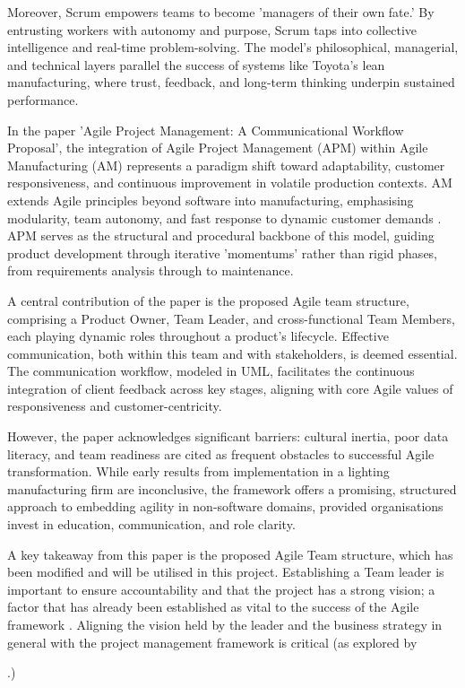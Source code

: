 \documentclass{report}
\begin{document}
Moreover, Scrum empowers teams to become 'managers of their own fate.' By entrusting workers with autonomy and purpose, Scrum taps into collective intelligence and real-time problem-solving. The model's philosophical, managerial, and technical layers parallel the success of systems like Toyota's lean manufacturing, where trust, feedback, and long-term thinking underpin sustained performance.

In the paper 'Agile Project Management: A Communicational Workflow Proposal', the integration of Agile Project Management (APM) within Agile Manufacturing (AM) represents a paradigm shift toward adaptability, customer responsiveness, and continuous improvement in volatile production contexts. AM extends Agile principles beyond software into manufacturing, emphasising modularity, team autonomy, and fast response to dynamic customer demands \parencite{loiroAgileProjectManagement2019}. APM serves as the structural and procedural backbone of this model, guiding product development through iterative 'momentums' rather than rigid phases, from requirements analysis through to maintenance.

A central contribution of the paper is the proposed Agile team structure, comprising a Product Owner, Team Leader, and cross-functional Team Members, each playing dynamic roles throughout a product's lifecycle. Effective communication, both within this team and with stakeholders, is deemed essential. The communication workflow, modeled in UML, facilitates the continuous integration of client feedback across key stages, aligning with core Agile values of responsiveness and customer-centricity.

However, the paper acknowledges significant barriers: cultural inertia, poor data literacy, and team readiness are cited as frequent obstacles to successful Agile transformation. While early results from implementation in a lighting manufacturing firm are inconclusive, the framework offers a promising, structured approach to embedding agility in non-software domains, provided organisations invest in education, communication, and role clarity.

A key takeaway from this paper is the proposed Agile Team structure, which has been modified and will be utilised in this project. Establishing a Team leader is important to ensure accountability and that the project has a strong vision; a factor that has already been established as vital to the success of the Agile framework \parencite{serradorDoesAgileWork2015}. Aligning the vision held by the leader and the business strategy in general with the project management framework is critical (as explored by \author{alsudiriAlignmentLargeProject2013}.) 
\end{document}
